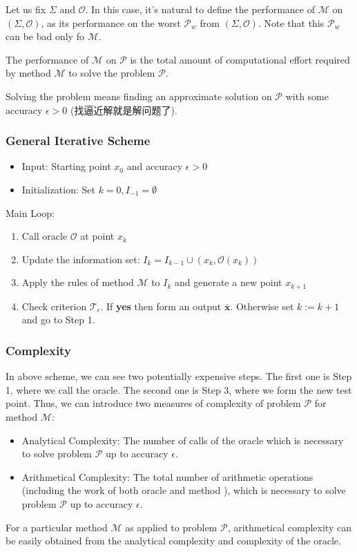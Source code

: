 Let us fix $\Sigma$ and $\mathcal{O}$. In this case, it's natural to define the performance of $\mathcal{M}$ on $(\Sigma, \mathcal{O})$, as its performance on the worst $\mathcal{P}_w$ from $(\Sigma, \mathcal{O})$. Note that this $\mathcal{P}_w$ can be bad only fo $\mathcal{M}$. 
\begin{definition}
    The performance of $\mathcal{M}$ on $\mathcal{P}$ is the total amount of computational effort required by method $\mathcal{M}$ to solve the problem $\mathcal{P}$. 
\end{definition}
Solving the problem means finding an approximate solution on $\mathcal{P}$ with some accuracy $\epsilon>0$ (找逼近解就是解问题了). 

\subsubsection{General Iterative Scheme}
\begin{itemize}
    \item Input: Starting point $x_0$ and accuracy $\epsilon>0$
    \item Initialization: Set $k=0, I_{-1}=\emptyset$
\end{itemize}

Main Loop:
\begin{enumerate}
    \item Call oracle $\mathcal{O}$ at point $x_k$
    \item Update the information set: $I_k=I_{k-1}\cup (x_k, \mathcal{O}(x_k))$
    \item Apply the rules of method $\mathcal{M}$ to $I_k$ and generate a new point $x_{k+1}$
    \item Check criterion $\mathcal{T}_\epsilon$. If \textbf{yes} then form an output $\bar{\bm x}$. Otherwise set $k:=k+1$ and go to Step 1. 
\end{enumerate}

\subsubsection{Complexity}
In above scheme,  we can see two potentially expensive steps. The first one is Step 1, where we call the oracle. The second one is Step 3, where we form the new test point. Thus, we can introduce two measures of complexity of problem $\mathcal{P}$ for method $\mathcal{M}$:
\begin{itemize}
    \item Analytical Complexity: The number of calls of the oracle which is necessary to solve problem $\mathcal{P}$ up to accuracy $\epsilon$. 
    \item Arithmetical Complexity: The total number of arithmetic operations (including the work of both oracle and method ), which is necessary to solve problem $\mathcal{P}$ up to accuracy $\epsilon$. 
\end{itemize}
For a particular method $\mathcal{M}$ as applied to problem $\mathcal{P}$, arithmetical complexity can be easily obtained from the analytical complexity and complexity of the oracle.

